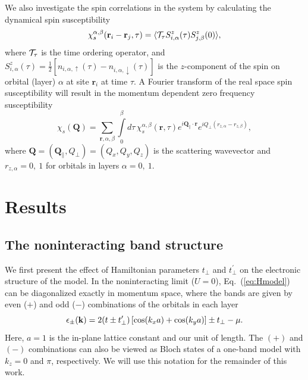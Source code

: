 \documentclass[prb,twocolumn,amsmath,amssymb,superscriptaddress,floatfix,nofootinbib]{revtex4-2}
\begin{document}
We also investigate the spin correlations in the system by calculating the dynamical spin susceptibility 
\begin{equation}
    \chi^{\alpha,\beta}_{s}(\mathbf{r}_i-\mathbf{r}_j,\tau) = \langle {\cal T}_\tau S_{i,\alpha}^{z}(\tau)S_{j,\beta}^{z}(0)\rangle,
\end{equation}
where ${\cal T}_\tau$ is the time ordering operator, and  $S_{i,\alpha}^{z}(\tau)= \frac{1}{2}\left[n_{i,\alpha,\uparrow}(\tau)-n_{i,\alpha,\downarrow}(\tau)\right]$ is the $z$-component of the spin on orbital (layer) $\alpha$ at site $\mathbf{r}_i$ at time $\tau$. A Fourier transform of the real space spin susceptibility will result in the momentum dependent zero frequency susceptibility 
\begin{equation}\label{eq:spinsus}
    \chi_{s}(\mathbf{Q}) = \sum_{\mathbf{r},\alpha,\beta} \int\limits_0^\beta d\tau\, \chi^{\alpha,\beta}_{s}(\mathbf{r},\tau) e^{i\mathbf{Q_{\parallel}}\cdot \mathbf{r}} e^{iQ_{\perp}(r_{z,\alpha}-r_{z,\beta})} ,
\end{equation}
where $\mathbf{Q} = (\mathbf{Q}_{\parallel}, Q_{\perp}) = (Q_x,Q_y, Q_z)$ is the scattering wavevector and $r_{z,\alpha} = 0,~1$ for orbitals in layers $\alpha = 0,~1$.

\section{Results}
\subsection{The noninteracting band structure}

We first present the effect of Hamiltonian parameters $t^{\phantom\prime}_\perp$ and $t_\perp^\prime$ on the electronic structure of the model. In the noninteracting limit ($U = 0$), Eq.~(\ref{eq:Hmodel}) can be diagonalized exactly in momentum space, where the bands are given by even ($+$) and odd ($-$) combinations of the orbitals in each layer \cite{KurokiFlex2020}
\begin{equation}\label{eq:epsilon0}
    \epsilon_\pm({\bf k})= 2(t\pm t_\perp^\prime)\left[\cos(k_xa)+\cos(k_ya)\right] \pm  t_\perp - \mu. 
\end{equation}
Here, $a=1$ is the in-plane lattice constant and our unit of length. The $(+)$ and $(-)$ combinations can also be viewed as Bloch states of a one-band model with $k_z = 0$ and $\pi$, respectively. We will use this notation for the remainder of this work. 
\end{document}
